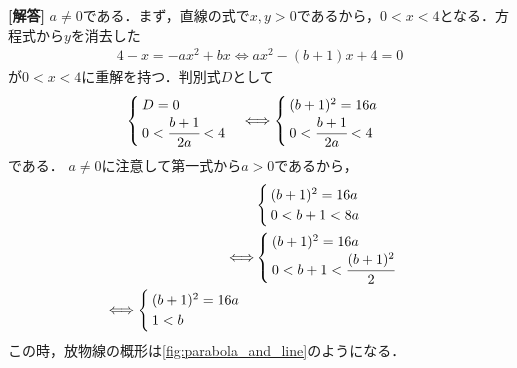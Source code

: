 \documentclass[../../main.tex]{subfiles}
\begin{document}
\begin{oframed}
  
\end{oframed}

{\bf [解答]} $a\not=0$である．まず，直線の式で$x,y>0$であるから，$0<x<4$となる．方程式から$y$を消去した
\begin{align}
  4-x=-ax^2+bx \Longleftrightarrow ax^2-(b+1)x+4=0
\end{align}
が$0<x<4$に重解を持つ．判別式$D$として
\begin{align}
  \begin{cases}
    D=0 \\
    0<\cfrac{b+1}{2a}<4
  \end{cases}
  \Longleftrightarrow
  \begin{cases}
    (b+1)^2=16a \\
    0<\cfrac{b+1}{2a}<4
  \end{cases}
\end{align}
である．
$a\neq 0$に注意して第一式から$a>0$であるから，
\begin{align}
  &
  \begin{cases}
    (b+1)^2=16a \\
    0<b+1<8a
  \end{cases} \\
  \Longleftrightarrow
  &
  \begin{cases}
    (b+1)^2=16a \\
    0<b+1<\cfrac{(b+1)^2}{2}
  \end{cases} \\
  \Longleftrightarrow
  \begin{cases}
    (b+1)^2=16a \\
    1<b
  \end{cases} \label{eq:1}
\end{align}
この時，放物線の概形は\cref{fig:parabola_and_line}のようになる．
\end{document}
